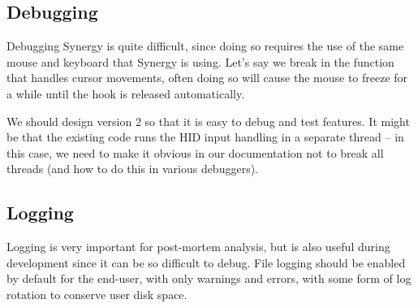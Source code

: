 \subsection{Debugging}

Debugging Synergy is quite difficult, since doing so requires the use of the 
same mouse and keyboard that Synergy is using. Let's say we break in the 
function that handles cursor movements, often doing so will cause the mouse
to freeze for a while until the hook is released automatically.

We should design version 2 so that it is easy to debug and test features. It
might be that the existing code runs the HID input handling in a separate 
thread -- in this case, we need to make it obvious in our documentation not to 
break all threads (and how to do this in various debuggers).

\subsection{Logging}

Logging is very important for post-mortem analysis, but is also useful during
development since it can be so difficult to debug. File logging should be 
enabled by default for the end-user, with only warnings and errors, with some
form of log  rotation to conserve user disk space.
